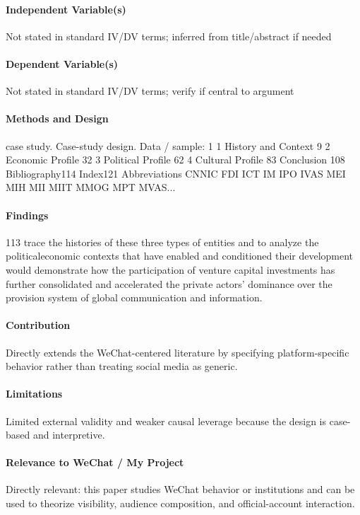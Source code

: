 \documentclass[12pt]{article}
\begin{document}
\paragraph{Independent Variable(s)} Not stated in standard IV/DV terms; inferred from title/abstract if needed

\paragraph{Dependent Variable(s)} Not stated in standard IV/DV terms; verify if central to argument

\paragraph{Methods and Design} case study. Case-study design. Data / sample:  1 1 History and Context 9 2 Economic Profile 32 3 Political Profile 62 4 Cultural Profile 83 Conclusion 108 Bibliography114 Index121 Abbreviations CNNIC FDI ICT IM IPO IVAS MEI MIH MII MIIT MMOG MPT MVAS...

\paragraph{Findings} 113 trace the histories of these three types of entities and to analyze the politicaleconomic contexts that have enabled and conditioned their development would demonstrate how the participation of venture capital investments has further consolidated and accelerated the private actors' dominance over the provision system of global communication and information.

\paragraph{Contribution} Directly extends the WeChat-centered literature by specifying platform-specific behavior rather than treating social media as generic.

\paragraph{Limitations} Limited external validity and weaker causal leverage because the design is case-based and interpretive.

\paragraph{Relevance to WeChat / My Project} Directly relevant: this paper studies WeChat behavior or institutions and can be used to theorize visibility, audience composition, and official-account interaction.
\end{document}
